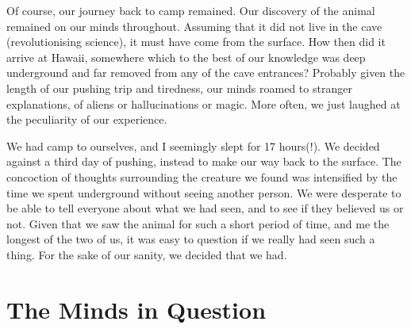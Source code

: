 
Of course, our journey back to camp remained. Our discovery of the animal remained on our minds throughout. Assuming that it did not live in the cave (revolutionising science), it must have come from the surface. How then did it arrive at Hawaii, somewhere which to the best of our knowledge was deep underground and far removed from any of the cave entrances? Probably given the length of our pushing trip and tiredness, our minds roamed to stranger explanations, of aliens or hallucinations or magic. More often, we just laughed at the peculiarity of our experience. 

We had camp to ourselves, and I seemingly slept for 17 hours(!). We decided against a third day of pushing, instead to make our way back to the surface. The concoction of thoughts surrounding the creature we found was intensified by the time we spent underground without seeing another person. We were desperate to be able to tell everyone about what we had seen, and to see if they believed us or not. Given that we saw the animal for such a short period of time, and me the longest of the two of us, it was easy to question if we really had seen such a thing. For the sake of our sanity, we decided that we had. 





\section{The Minds in Question}

